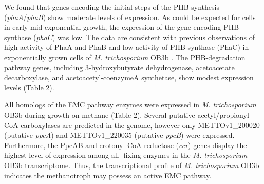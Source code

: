 We found that genes encoding the initial steps of the PHB-synthesis (\textit{phaA}/\textit{phaB}) show moderate levels of expression.
As could be expected for cells in early-mid exponential growth, the expression of the gene encoding PHB synthase (\textit{phaC}) was low.
The data are consistent with previous observations of high activity of PhaA and PhaB and low activity of PHB synthase (PhaC) in exponentially grown cells of \textit{M. trichosporium} OB3b \cite{williams1998, doronina2008}.
The PHB-degradation pathway genes, including 3-hydroxybutyrate dehydrogenase, acetoacetate decarboxylase, and acetoacetyl-coenzymeA synthetase, show modest expression levels (Table 2).

All homologs of the EMC pathway enzymes were expressed in \textit{M. trichosporium} OB3b during growth on methane (Table 2).
Several putative acetyl/propionyl-CoA carboxylases are predicted in the genome, however only METTOv1\_200020 (putative \textit{ppcA}) and METTOv1\_220035 (putative \textit{ppcB}) were expressed.
Furthermore, the PpcAB and crotonyl-CoA reductase (\textit{ccr}) genes display the highest level of expression among all -fixing enzymes in the \textit{M. trichosporium} OB3b transcriptome.
Thus, the transcriptional profile of \textit{M. trichosporium} OB3b indicates the methanotroph may possess an active EMC pathway.


